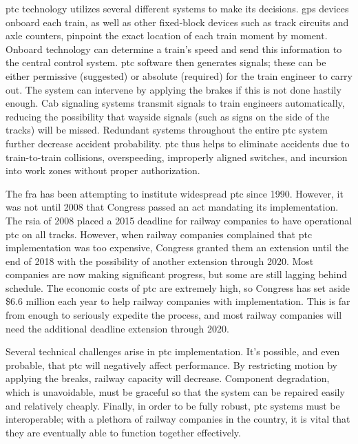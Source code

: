 \documentclass[11pt, titlepage]{article}
\begin{document}
\gls{ptc} technology utilizes several different systems to make its decisions.
\gls{gps} devices onboard each train, as well as other fixed-block devices
such as track circuits and axle counters, pinpoint the exact location of each
train moment by moment. Onboard technology can determine a train’s speed and send
this information to the central control system. \gls{ptc} software then generates
signals; these can be either permissive (suggested) or absolute (required) for
the train engineer to carry out. The system can intervene by applying the
brakes if this is not done hastily enough. Cab signaling systems transmit
signals to train engineers automatically, reducing the possibility that
wayside signals (such as signs on the side of the tracks) will be missed.
Redundant systems throughout the entire \gls{ptc} system further decrease
accident probability. \gls{ptc} thus helps to eliminate accidents due to
train-to-train collisions, overspeeding, improperly aligned switches, and
incursion into work zones without proper authorization.

The \gls{fra} has been attempting to institute widespread \gls{ptc} since
1990. However, it was not until 2008 that Congress passed an act mandating its
implementation. The \gls{rsia} of 2008 placed a 2015 deadline for railway
companies to have operational \gls{ptc} on all tracks. However, when railway
companies complained that \gls{ptc} implementation was too expensive, Congress
granted them an extension until the end of 2018 with the possibility of
another extension through 2020. Most companies are now making significant
progress, but some are still lagging behind schedule. The economic costs of
\gls{ptc} are extremely high, so Congress has set aside \$6.6 million each
year to help railway companies with implementation. This is far from enough to
seriously expedite the process, and most railway companies will need the
additional deadline extension through 2020.

Several technical challenges arise in \gls{ptc} implementation. It’s possible,
and even probable, that \gls{ptc} will negatively affect performance. By
restricting motion by applying the breaks, railway capacity  will decrease.
Component degradation, which is unavoidable, must be graceful so that the
system can be repaired easily and relatively cheaply. Finally, in order to be
fully robust, \gls{ptc} systems must be interoperable; with a plethora of
railway companies in the country, it is vital that they are eventually able to
function together effectively.
\end{document}
